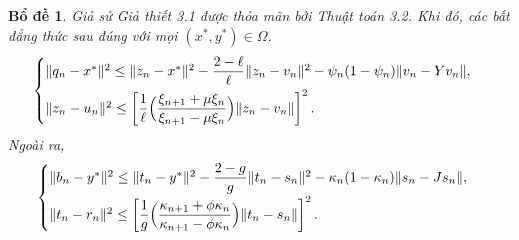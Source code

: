 \documentclass[11pt,a4paper]{article}
\theoremstyle{plain}
\newtheorem{lemma}[theorem]{Bổ đề}
\theoremstyle{definition}
\theoremstyle{remark}
\numberwithin{equation}{section}
\newcommand{\nm}[1]{\lVert #1\rVert}
\begin{document}
\begin{lemma}\label{lem:4.3}
Giả sử Giả thiết 3.1 được thỏa mãn bởi Thuật toán 3.2. Khi đó, các bất đẳng thức sau đúng với mọi $(x^{*},y^{*})\in\Omega$.
\[
\begin{cases}
\nm{q_n-x^{*}}^2\le\nm{z_n-x^{*}}^2-\dfrac{2-\ell}{\ell}\nm{z_n-v_n}^2-\psi_n(1-\psi_n)\nm{v_n-Yv_n},\\[6pt]
\nm{z_n-u_n}^2\le\left[\dfrac{1}{\ell}\Bigl(\dfrac{\xi_{n+1}+\mu\xi_n}{\xi_{n+1}-\mu\xi_n}\Bigr)\nm{z_n-v_n}\right]^2.
\end{cases}
\]
Ngoài ra,
\[
\begin{cases}
\nm{b_n-y^{*}}^2\le\nm{t_n-y^{*}}^2-\dfrac{2-g}{g}\nm{t_n-s_n}^2-\kappa_n(1-\kappa_n)\nm{s_n-Js_n},\\[6pt]
\nm{t_n-r_n}^2\le\left[\dfrac{1}{g}\Bigl(\dfrac{\kappa_{n+1}+\phi\kappa_n}{\kappa_{n+1}-\phi\kappa_n}\Bigr)\nm{t_n-s_n}\right]^2.
\end{cases}
\]
\end{lemma}
\end{document}
